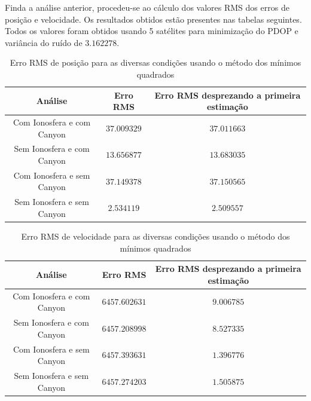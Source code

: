 \documentclass[palatino]{ist-report}
\begin{document}
\FloatBarrier

Finda a análise anterior, procedeu-se ao cálculo dos valores RMS dos erros de posição e velocidade. Os resultados obtidos estão presentes nas tabelas seguintes. Todos os valores foram obtidos usando 5 satélites para minimização do PDOP e variância do ruído de $3.162278$.

\begin{table}[ht]
    \centering
    
    \begin{tabular}{c c c}\toprule
        \textbf{Análise} & \textbf{Erro RMS} &\textbf{Erro RMS desprezando a primeira estimação}\\
        \midrule
        Com Ionosfera e com Canyon & $37.009329$ & $37.011663$\\
        Sem Ionosfera e com Canyon & $13.656877$ & $13.683035$\\
        Com Ionosfera e sem Canyon & $37.149378$ & $37.150565$\\
        Sem Ionosfera e sem Canyon & $2.534119$ & $2.509557$ \\
        \bottomrule
    \end{tabular}
    \caption{Erro RMS de posição para as diversas condições usando o método dos mínimos quadrados}
    \label{tab:something}
    
\end{table}

\begin{table}[ht]
    \centering
    \begin{tabular}{c c c}\toprule
        \textbf{Análise} & \textbf{Erro RMS} &\textbf{Erro RMS desprezando a primeira estimação}\\
        \midrule
        Com Ionosfera e com Canyon & $6457.602631$ & $9.006785$\\
        Sem Ionosfera e com Canyon & $6457.208998$ & $8.527335$\\
        Com Ionosfera e sem Canyon & $6457.393631$ & $1.396776$\\
        Sem Ionosfera e sem Canyon & $6457.274203$ & $1.505875$ \\
        \bottomrule
    \end{tabular}
    \caption{Erro RMS de velocidade para as diversas condições usando o método dos mínimos quadrados}
    \label{tab:something}
\end{table}
\end{document}
